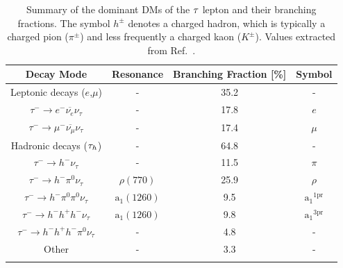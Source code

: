 \begin{table}[htbp]
\centering
\renewcommand{\arraystretch}{1.5} %
\begin{tabular}{|c|c|c|c|}
\hline
Decay Mode & Resonance & Branching Fraction [\%] & Symbol \\ \hline \hline 
\rowcolor{verylightblue}
Leptonic decays ($e$,$\mu$)                               & - & 35.2 & - \\ 
\arrayrulecolor{lightgray} \hline
$\tau^- \rightarrow e^- \overline{\nu_e} \nu_\tau$ & - & 17.8 & $e$ \\ 
\arrayrulecolor{lightgray} \hline
$\tau^- \rightarrow \mu^- \overline{\nu_\mu} \nu_\tau$ & - & 17.4 & $\mu$ \\ 
\arrayrulecolor{lightgray}  \hline 
\rowcolor{verylightblue}
Hadronic decays ($\tau_h$)   & - & 64.8 & -\\ 
\arrayrulecolor{lightgray} \hline
$\tau^- \rightarrow h^- \nu_\tau$ & - & 11.5 & $\pi$ \\ 
\arrayrulecolor{lightgray} \hline
$\tau^- \rightarrow h^- \pi^0\nu_\tau$ & $\rho(770)$ & 25.9 & $\rho$ \\ 
\arrayrulecolor{lightgray} \hline
$\tau^- \rightarrow h^- \pi^0\pi^0\nu_\tau$ & $\mathrm{a_1}(1260)$ & 9.5 & $\mathrm{a_1}^{\text{1pr}}$\\ 
\arrayrulecolor{lightgray} \hline
$\tau^- \rightarrow h^- h^+ h^- \nu_\tau$ & $\mathrm{a_1}(1260)$ & 9.8 & $\mathrm{a_1}^{\text{3pr}}$ \\ 
\arrayrulecolor{lightgray} \hline
$\tau^- \rightarrow h^- h^+ h^- \pi^0\nu_\tau$ & - & 4.8 & - \\ 
\arrayrulecolor{lightgray} \hline
Other & - & 3.3 & -\\ 
\arrayrulecolor{lightgray} \hline
\arrayrulecolor{black} \hline
\end{tabular}
\caption[Dominant $\PGt$ lepton decay modes and branching fractions]{Summary of the dominant \acp{DM} of the $\PGt$ lepton and their branching fractions. The symbol $h^\pm$ denotes a charged hadron, which is typically a charged pion ($\pi^\pm$) and less frequently a charged kaon ($K^\pm$). Values extracted from Ref.~\cite{ParticleMasses}.}
\label{Table:Chapter4_TauDecayModes}
\end{table}

